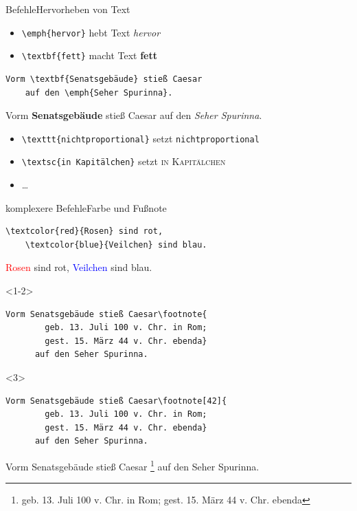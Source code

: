 \begin{Frame}[fragile]{Befehle}{Hervorheben von Text}
  \begin{itemize}
    \item \lstinline-\emph{hervor}- hebt Text \emph{hervor}
    \item \lstinline-\textbf{fett}- macht Text \textbf{fett}
  \end{itemize}

  \xxx

  \begin{lstlisting}[gobble=4]
    Vorm \textbf{Senatsgebäude} stieß Caesar
    auf den \emph{Seher Spurinna}.
  \end{lstlisting}

  Vorm \textbf{Senatsgebäude} stieß Caesar
    auf den \emph{Seher Spurinna}.

  \xxx\pause

  \begin{itemize}
    \item \lstinline-\texttt{nichtproportional}- setzt \texttt{nichtproportional}
    \item \lstinline-\textsc{in Kapitälchen}- setzt \textsc{in Kapitälchen}
    \item \ldots
  \end{itemize}
\end{Frame}

\begin{Frame}[fragile]{komplexere Befehle}{Farbe und Fußnote}
  \begin{lstlisting}[gobble=4]
    \textcolor{red}{Rosen} sind rot,
    \textcolor{blue}{Veilchen} sind blau.
  \end{lstlisting}
  \textcolor{red}{Rosen} sind rot,
  \textcolor{blue}{Veilchen} sind blau.
  
  \xxx\pause

  \begin{onlyenv}<1-2>
    \begin{lstlisting}[gobble=6]
      Vorm Senatsgebäude stieß Caesar\footnote{
        geb. 13. Juli 100 v. Chr. in Rom;
        gest. 15. März 44 v. Chr. ebenda}
      auf den Seher Spurinna.
    \end{lstlisting}
  \end{onlyenv}
  \begin{onlyenv}<3>
    \begin{lstlisting}[gobble=6]
      Vorm Senatsgebäude stieß Caesar\footnote[42]{
        geb. 13. Juli 100 v. Chr. in Rom;
        gest. 15. März 44 v. Chr. ebenda}
      auf den Seher Spurinna.
    \end{lstlisting}
  \end{onlyenv}
  \begin{minipage}{\textwidth}
    \renewcommand{\thempfootnote}{\arabic{mpfootnote}}
    Vorm Senatsgebäude stieß
      Caesar
        {\footnote[42]{
        geb. 13. Juli 100 v. Chr. in Rom;
        gest. 15. März 44 v. Chr. ebenda}}
      auf den Seher Spurinna.
  \end{minipage}
\end{Frame}

